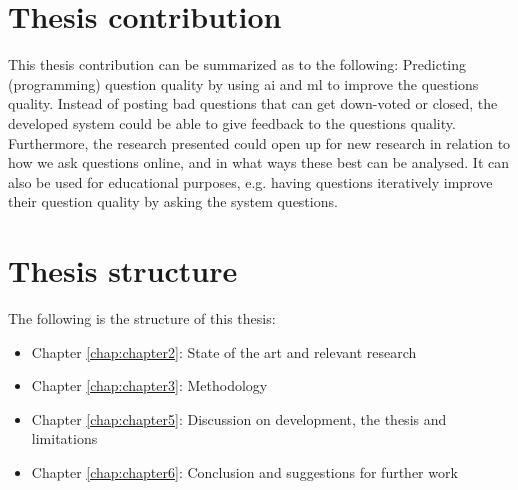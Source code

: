\section{Thesis contribution}
\label{sec:thesis_contribution}
This thesis contribution can be summarized as to the following: 
Predicting (programming) question quality by  using \gls{ai} and \gls{ml} to improve the questions quality. 
Instead of posting bad questions that can get down-voted or closed, the developed system could be able to give feedback to the questions quality. 
Furthermore, the research presented could open up for new research in relation to how we ask questions online, and in what ways these best can be analysed.
It can also be used for educational purposes, e.g. having questions iteratively improve their question quality by asking the system questions.

\section{Thesis structure}
\label{sec:thesis_structure}
The following is the structure of this thesis:
\begin{itemize}
	\item Chapter \ref{chap:chapter2}: State of the art and relevant research
	\item Chapter \ref{chap:chapter3}: Methodology 
	\item Chapter \ref{chap:chapter5}: Discussion on development, the thesis and limitations
	\item Chapter \ref{chap:chapter6}: Conclusion and suggestions for further work
\end{itemize}

